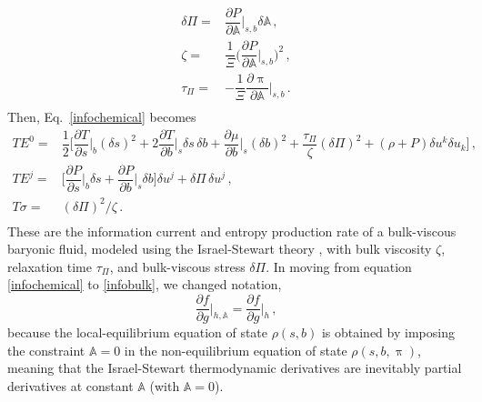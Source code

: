 \documentclass[a4paper, amsfonts, amssymb, amsmath, reprint, showkeys, nofootinbib, twoside, onecolumn,notitlepage]{revtex4-1}
\begin{document}
\begin{equation}
\begin{split}
\delta \Pi ={}& \dfrac{\partial P}{\partial \mathbb{A}}\bigg|_{s,b} \delta \mathbb{A} \, , \\
\zeta ={}& \dfrac{1}{\Xi} \bigg( \dfrac{\partial P}{\partial \mathbb{A}}\bigg|_{s,b} \bigg)^2 \, , \\
\tau_\Pi ={}& -\dfrac{1}{\Xi} \dfrac{\partial \uppi}{\partial \mathbb{A}} \bigg|_{s,b} \, . \\
\end{split}
\end{equation}
Then, Eq.\ \eqref{infochemical} becomes
\begin{equation}\label{infobulk}
\begin{split}
TE^0 ={}& \dfrac{1}{2} \bigg[\dfrac{\partial T}{\partial s}\bigg|_{b}  \! (\delta s)^2 + 2 \dfrac{\partial T}{\partial b}\bigg|_{s}  \! \delta s \, \delta b + \dfrac{\partial \mu}{\partial b}\bigg|_{s} \!(\delta b)^2 + \dfrac{\tau_\Pi}{\zeta} (\delta \Pi)^2 + (\rho+P) \delta u^k \delta u_k  \bigg] \, , \\
TE^j ={}& \bigg[  \dfrac{\partial P}{\partial s}\bigg|_{b} \delta s+ \dfrac{\partial P}{\partial b}\bigg|_{s} \delta b \bigg] \delta u^j + \delta \Pi \, \delta u^j \, , \\
T\sigma ={}& (\delta \Pi)^2/\zeta \, . \\
\end{split}
\end{equation}
These are the information current and entropy production rate of a bulk-viscous baryonic fluid, modeled using the Israel-Stewart theory \cite{Hishcock1983}, with bulk viscosity $\zeta$, relaxation time $\tau_\Pi$, and bulk-viscous stress $\delta \Pi$. In moving from equation \eqref{infochemical} to \eqref{infobulk}, we changed notation,
\begin{equation}
\dfrac{\partial f}{\partial g}\bigg|_{h,\mathbb{A}} = \dfrac{\partial f}{\partial g}\bigg|_{h} \, ,  
\end{equation} 
because the local-equilibrium equation of state $\rho(s,b)$ is obtained by imposing the constraint $\mathbb{A}=0$ in the non-equilibrium equation of state $\rho(s,b,\uppi)$, meaning that the Israel-Stewart thermodynamic derivatives are inevitably partial derivatives at constant $\mathbb{A}$ (with $\mathbb{A}=0$). 
\end{document}
